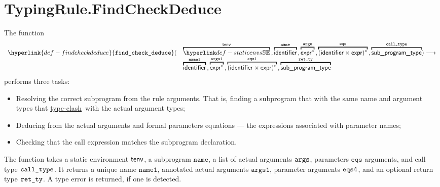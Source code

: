 \documentclass{book}
\newcommand\typeclash[0]{\hyperlink{def-typeclashes}{type-clash}}
\newcommand\findcheckdeduce[0]{\hyperlink{def-findcheckdeduce}{\texttt{find\_check\_deduce}}}
\newcommand\eqs[0]{\texttt{eqs}}
\newcommand\nameone[0]{\texttt{name1}}
\newcommand\vargsone[0]{\texttt{args1}}
\newcommand\name[0]{\texttt{name}}
\begin{document}
\section{TypingRule.FindCheckDeduce \label{sec:TypingRule.FindCheckDeduce}}
\hypertarget{def-findcheckdeduce}{}
The function
\[
  \begin{array}{rl}
    \findcheckdeduce( &
      \overname{\staticenvs}{\tenv} \aslsep
      \overname{\identifier}{\name} \aslsep
      \overname{\expr^*}{\vargs} \aslsep
      \overname{(\identifier\times\expr)^*}{\eqs} \aslsep
      \overname{\subprogramtype}{\calltype}
     ) \aslto \\ &
    \overname{\identifier}{\nameone} \aslsep
    \overname{\expr^*}{\vargsone} \aslsep
    \overname{(\identifier\times\expr)^*}{\eqsone} \aslsep
    \overname{\subprogramtype}{\retty}
  \end{array}
\]
performs three tasks:
\begin{itemize}
  \item Resolving the correct subprogram from the rule arguments. That is, finding a subprogram
  that with the same name and argument types that \typeclash\ with the actual argument types;
  \item Deducing from the actual arguments and formal parameters equations ---
  the expressions associated with parameter names;
  \item Checking that the call expression matches the subprogram declaration.
\end{itemize}
The function takes a static environment $\textsf{tenv}$, a subprogram $\name$,
a list of actual arguments $\texttt{args}$,
parameters $\eqs$ arguments, and call type $\texttt{call\_type}$.
It returns a unique name $\nameone$, annotated actual arguments $\vargsone$,
parameter arguments $\texttt{eqs4}$, and an optional return type $\texttt{ret\_ty}$.
A type error is returned, if one is detected.
\end{document}
